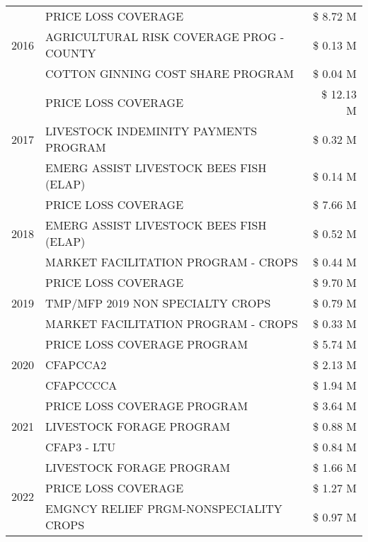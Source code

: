 \begin{tabular}{llr}
\cline{1-3}
\multirow[t]{3}{*}{2016} & PRICE LOSS COVERAGE & \$ 8.72 M \\
 & AGRICULTURAL RISK COVERAGE PROG - COUNTY & \$ 0.13 M \\
 & COTTON GINNING COST SHARE PROGRAM & \$ 0.04 M \\
\cline{1-3}
\multirow[t]{3}{*}{2017} & PRICE LOSS COVERAGE & \$ 12.13 M \\
 & LIVESTOCK INDEMINITY PAYMENTS PROGRAM & \$ 0.32 M \\
 & EMERG ASSIST LIVESTOCK BEES FISH (ELAP) & \$ 0.14 M \\
\cline{1-3}
\multirow[t]{3}{*}{2018} & PRICE LOSS COVERAGE & \$ 7.66 M \\
 & EMERG ASSIST LIVESTOCK BEES FISH (ELAP) & \$ 0.52 M \\
 & MARKET FACILITATION PROGRAM - CROPS & \$ 0.44 M \\
\cline{1-3}
\multirow[t]{3}{*}{2019} & PRICE LOSS COVERAGE & \$ 9.70 M \\
 & TMP/MFP 2019 NON SPECIALTY CROPS & \$ 0.79 M \\
 & MARKET FACILITATION PROGRAM - CROPS & \$ 0.33 M \\
\cline{1-3}
\multirow[t]{3}{*}{2020} & PRICE LOSS COVERAGE PROGRAM & \$ 5.74 M \\
 & CFAPCCA2 & \$ 2.13 M \\
 & CFAPCCCCA & \$ 1.94 M \\
\cline{1-3}
\multirow[t]{3}{*}{2021} & PRICE LOSS COVERAGE PROGRAM & \$ 3.64 M \\
 & LIVESTOCK FORAGE PROGRAM & \$ 0.88 M \\
 & CFAP3 - LTU & \$ 0.84 M \\
\cline{1-3}
\multirow[t]{3}{*}{2022} & LIVESTOCK FORAGE PROGRAM & \$ 1.66 M \\
 & PRICE LOSS COVERAGE & \$ 1.27 M \\
 & EMGNCY RELIEF PRGM-NONSPECIALITY CROPS & \$ 0.97 M \\
\cline{1-3}
\bottomrule
\end{tabular}
